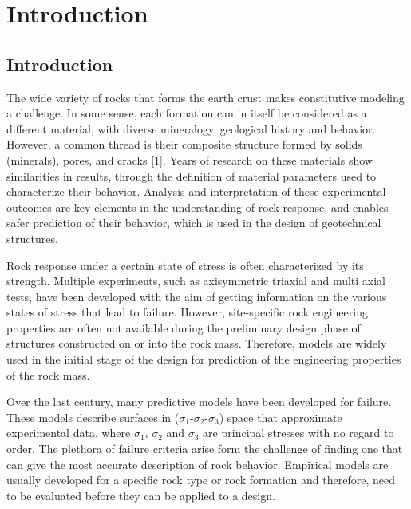 \chapter{Introduction}
\section{Introduction}

The wide variety of rocks that forms the earth crust makes constitutive modeling a challenge. In some sense, each formation can in itself be considered as a different material, with diverse mineralogy, geological history and behavior. However, a common thread is their composite structure formed by solids (minerals), pores, and cracks [1]. Years of research on these materials show similarities in results, through the definition of material parameters used to characterize their behavior. Analysis and interpretation of these experimental outcomes are key elements in the understanding of rock response, and enables safer prediction of their behavior, which is used in the design of geotechnical structures. 

Rock response under a certain state of stress is often characterized by its strength. Multiple experiments, such as axisymmetric triaxial and multi axial tests, have been developed with the aim of getting information on the various states of stress that lead to failure. However, site-specific rock engineering properties are often not available during the preliminary design phase of structures constructed on or into the rock mass. Therefore, models are widely used in the initial stage of the design for prediction of the engineering properties of the rock mass. 

Over the last century, many predictive models have been developed for failure. These models describe surfaces in ($\sigma_1$-$\sigma_2$-$\sigma_3$) space that approximate experimental data, where $\sigma_1$, $\sigma_2$ and $\sigma_3$ are principal stresses with no regard to order. The plethora of failure criteria arise form the challenge of finding one that can give the most accurate description of rock behavior. Empirical models are usually developed for a specific rock type or rock formation and therefore, need to be evaluated before they can be applied to a design.

